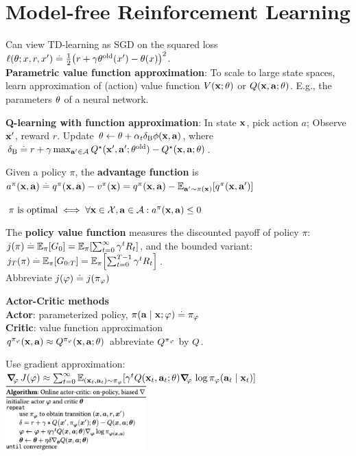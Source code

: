 \section{Model-free Reinforcement Learning}
Can view TD-learning as SGD on the squared loss $\ell(\vtheta; x, r, x') \defeq \frac{1}{2}\parentheses*{r + \gamma \old{\vtheta}(x') - \vtheta(x)}^2$. \\
\textbf{Parametric value function approximation}: To scale to large state spaces, learn approximation
of (action) value function $\V{\vx; \vtheta}$ or $\Q{\vx}{\va; \vtheta}$. E.g., the parameters $\mathbf{\theta}$ of a neural network.
\begin{framed}
    \textbf{Q-learning with function approximation}: In state $\mathbf{x}$, pick action $a$; Observe $\mathbf{x}'$, reward $r$. Update $\mathbf{\theta} \gets \mathbf{\theta} + \alpha_t \delta_\mathrm{B} \mathbf{\phi}(\mathbf{x}, \mathbf{a})$, where $\delta_\mathrm{B} \defeq r + \gamma \max_{\vap \in \spA} \Q*{\vxp}{\vap; \old{\vtheta}} - \Q*{\vx}{\va; \vtheta}$.
\end{framed}
\vspace{1mm}
\begin{framed}
    Given a policy $\pi$, the \textbf{advantage function} is $\a[\pi]{\vx}{\va} \defeq \q[\pi]{\vx}{\va} - \v[\pi]{\vx} = \q[\pi]{\vx}{\va} - \E[\vap \sim \pi(\vx)]{\q[\pi]{\vx}{\vap}}$
\end{framed}
$\text{$\pi$ is optimal} \iff \forall \vx \in \spX, \va \in \spA : \a[\pi]{\vx}{\va} \leq 0$
\begin{framed}
    The \textbf{policy value function} measures the discounted payoff of policy $\pi$: $\j{\pi} \defeq \E[\pi]{G_0} = \E[\pi]{\sum_{t=0}^\infty \gamma^t R_t}$, 
    and the bounded variant: $\j{\pi}[T] \defeq \E[\pi]{G_{0:T}} = \E[\pi]{\sum_{t=0}^{T-1} \gamma^t R_t}$. \\
    Abbreviate $\j{\vvarphi} \defeq \j{\pi_\vvarphi}$
\end{framed}
\vspace{1mm}
\begin{framed}
  \textbf{Actor-Critic methods} \\
  \textbf{Actor}: parameterized policy, $\pi(\mathbf{a} \mid \mathbf{x}; \mathbf{\varphi}) \overset{.}{=} \pi_{\mathbf{\varphi}}$ \\
  \textbf{Critic}: value function approximation \\
   $\q[\pi_\vvarphi]{\vx}{\va} \approx \Q[\pi_\vvarphi]{\vx}{\va; \vtheta}$ abbreviate $\fnQ[\pi_\vvarphi]$ by $\fnQ$.
\end{framed}
Use gradient approximation: 
\tiny{$\grad_\vvarphi \J{\vvarphi} \approx \sum_{t=0}^\infty\E[(\vx_t,\va_t) \sim \pi_\vvarphi]{\gamma^t \Q{\vx_t}{\va_t; \vtheta} \grad_\vvarphi \log \pi_\vvarphi(\va_t \mid \vx_t)}$}
\includegraphics[width=0.95\linewidth, trim={0 0 4cm 0}, height=2.5cm]{images/Online_actor_critic.png}
